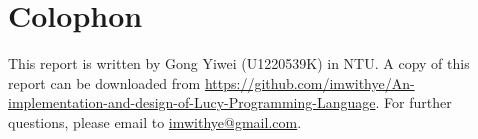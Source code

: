 \chapter*{Colophon}

\begin{center}
This report is written by Gong Yiwei (U1220539K) in NTU. A copy of this report can be downloaded from \url{https://github.com/imwithye/An-implementation-and-design-of-Lucy-Programming-Language}. For further questions, please email to \url{imwithye@gmail.com}.
\end{center}
